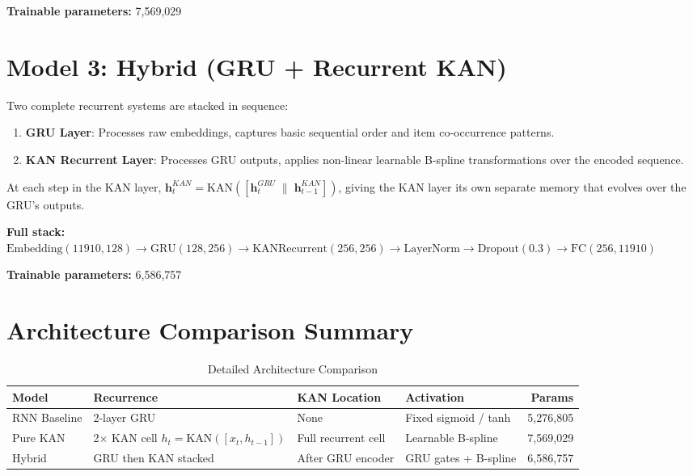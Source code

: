 \documentclass[12pt,a4paper]{report}
\begin{document}
\noindent\textbf{Trainable parameters:} 7,569,029

\section{Model 3: Hybrid (GRU + Recurrent KAN)}

Two complete recurrent systems are stacked in sequence:

\begin{enumerate}
    \item \textbf{GRU Layer}: Processes raw embeddings, captures basic sequential
          order and item co-occurrence patterns.
    \item \textbf{KAN Recurrent Layer}: Processes GRU outputs, applies non-linear
          learnable B-spline transformations over the encoded sequence.
\end{enumerate}

At each step in the KAN layer,
$\mathbf{h}^{KAN}_t = \text{KAN}([\mathbf{h}^{GRU}_t \; \| \; \mathbf{h}^{KAN}_{t-1}])$,
giving the KAN layer its own separate memory that evolves over the GRU's outputs.

\noindent\textbf{Full stack:}
$\text{Embedding}(11910, 128) \to \text{GRU}(128, 256) \to
 \text{KANRecurrent}(256, 256) \to \text{LayerNorm} \to \text{Dropout}(0.3) \to \text{FC}(256, 11910)$

\noindent\textbf{Trainable parameters:} 6,586,757

\section{Architecture Comparison Summary}

\begin{table}[H]
\centering
\caption{Detailed Architecture Comparison}
\begin{tabular}{p{2.2cm} p{2.8cm} p{2.8cm} p{2.5cm} r}
\toprule
\textbf{Model}   & \textbf{Recurrence}         & \textbf{KAN Location} & \textbf{Activation}    & \textbf{Params}  \\
\midrule
RNN Baseline
  & 2-layer GRU
  & None
  & Fixed sigmoid / tanh
  & 5,276,805 \\[4pt]
Pure KAN
  & 2$\times$ KAN cell \newline $h_t{=}\text{KAN}([x_t,h_{t-1}])$
  & Full recurrent cell
  & Learnable B-spline
  & 7,569,029 \\[4pt]
Hybrid
  & GRU then KAN stacked
  & After GRU encoder
  & GRU gates + B-spline
  & 6,586,757 \\
\bottomrule
\end{tabular}
\label{tab:arch_summary}
\end{table}
\end{document}
